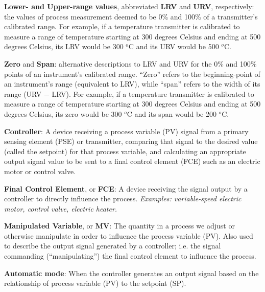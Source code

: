\vskip 10pt

\noindent
\textbf{Lower- and Upper-range values}, abbreviated \textbf{LRV} and \textbf{URV}, respectively: the values of process measurement deemed to be 0\% and 100\% of a transmitter's calibrated range.  For example, if a temperature transmitter is calibrated to measure a range of temperature starting at 300 degrees Celsius and ending at 500 degrees Celsius, its LRV would be 300 $^{o}$C and its URV would be 500 $^{o}$C.    

\vskip 10pt

\noindent
\textbf{Zero} and \textbf{Span}: alternative descriptions to LRV and URV for the 0\% and 100\% points of an instrument's calibrated range.  ``Zero'' refers to the beginning-point of an instrument's range (equivalent to LRV), while ``span'' refers to the width of its range (URV $-$ LRV).  For example, if a temperature transmitter is calibrated to measure a range of temperature starting at 300 degrees Celsius and ending at 500 degrees Celsius, its zero would be 300 $^{o}$C and its span would be 200 $^{o}$C.   

\vskip 10pt

\noindent
\textbf{Controller}: A device receiving a process variable (PV) signal from a primary sensing element (PSE) or transmitter, comparing that signal to the desired value (called the setpoint) for that process variable, and calculating an appropriate output signal value to be sent to a final control element (FCE) such as an electric motor or control valve.  

\vskip 10pt

\noindent
\textbf{Final Control Element}, or \textbf{FCE}: A device receiving the signal output by a controller to directly influence the process.  \textit{Examples: variable-speed electric motor, control valve, electric heater.} 

\vskip 10pt

\noindent
\textbf{Manipulated Variable}, or \textbf{MV}: The quantity in a process we adjust or otherwise manipulate in order to influence the process variable (PV).  Also used to describe the output signal generated by a controller; i.e. the signal commanding (``manipulating'') the final control element to influence the process.   

\vskip 10pt

\noindent
\textbf{Automatic mode}: When the controller generates an output signal based on the relationship of process variable (PV) to the setpoint (SP).   

